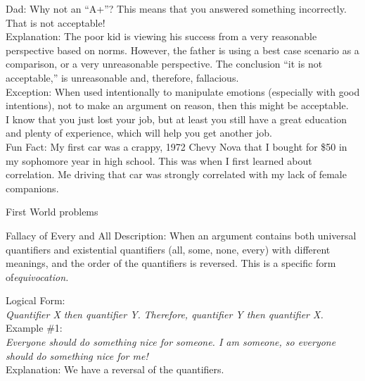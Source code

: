 \documentclass[a4paper,12pt,single,pdftex]{scrartcl}
\begin{document}
{    
      Dad:  Why not an “A+”?  This means that you answered something incorrectly.  That is not acceptable!
    \\

    
      Explanation: The poor kid is viewing his success from a very reasonable perspective based on norms.  However, the father is using a best case scenario as a comparison, or a very unreasonable perspective.  The conclusion “it is not acceptable,” is unreasonable and, therefore, fallacious.
    \\

    
      Exception: When used intentionally to manipulate emotions (especially with good intentions), not to make an argument on reason, then this might be acceptable.
    \\

    
      I know that you just lost your job, but at least you still have a great education and plenty of experience, which will help you get another job.
    \\

    
      Fun Fact: My first car was a crappy, 1972 Chevy Nova that I bought for \$50 in my sophomore year in high school. This was when I first learned about correlation. Me driving that car was strongly correlated with my lack of female companions.
    \\

  }


First World problems

Fallacy of Every and All
    Description: When an argument contains both universal quantifiers and existential quantifiers (all, some, none, every) with different meanings, and the order of the quantifiers is reversed. This is a specific form of{\it  equivocation. \newline
}

    
      Logical Form:
    \\

    
      {\em Quantifier X then quantifier Y.} \newline
{\em Therefore, quantifier Y then quantifier X.}
    \\

    
      Example \#1:
    \\

    
      {\em Everyone should do something nice for someone. I am someone, so everyone should do something nice for me!}
    \\

    
      Explanation: We have a reversal of the quantifiers. \newline
\end{document}
